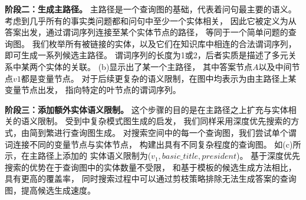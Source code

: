 \textbf{阶段二：生成主路径。}
主路径是一个查询图的基础，代表着问句最主要的语义。
考虑到几乎所有的事实类问题都和问句中至少一个实体相关，
因此它被定义为从答案出发，通过谓词序列连接至某个实体节点的路径，
等同于一个简单问题的查询图。
我们枚举所有被链接的实体，以及它们在知识库中相连的合法谓词序列，
即可生成一系列候选主路径。
谓词序列的长度为1或2，后者实质是描述了多元关系中某两个实体的关联。
(b)显示出了某一个主路径，
其中答案节点$A$以及中间节点$v1$都是变量节点。%
对于后续更复杂的语义限制，在图中均表示为由主路径上某变量节点出发，
指向特定的叶节点的谓词序列。

%  




\textbf{阶段三：添加额外实体语义限制。}
这个步骤的目的是在主路径之上扩充与实体相关的语义限制。
受到中复杂模式图生成的启发，
我们同样采用深度优先搜索的方式，由简到繁进行查询图生成。
对搜索空间中的每一个查询图，我们尝试单个谓词连接不同的变量节点与实体节点，
构建出具有不同复杂程度的查询图。
如(c)所示，在主路径上添加的
实体语义限制为($v_1, basic\_title, president$)。
基于深度优先搜索的优势在于查询图中的实体数量不受限，
和基于模板的候选生成方法相比，具有更高的覆盖率，
同时搜索过程中可以通过剪枝策略排除无法生成答案的查询图，提高候选生成速度。


